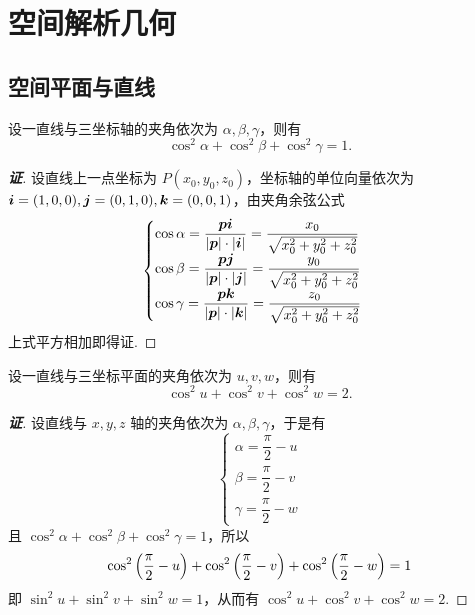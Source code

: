 \section{空间解析几何}

\subsection{空间平面与直线}

\begin{theorem}[线轴夹角余弦平方和公式]
    设一直线与三坐标轴的夹角依次为 $\alpha,\beta,\gamma$，则有 $$\cos^2\alpha+\cos^2\beta+\cos^2\gamma=1.$$
\end{theorem}
\begin{proof}[{\songti \textbf{证}}]
    设直线上一点坐标为 $P(x_0,y_0,z_0)$，坐标轴的单位向量依次为 $\vb*{i}=(1,0,0),\vb*{j}=(0,1,0),\vb*{k}=(0,0,1)$，由夹角余弦公式
    $$\begin{cases}
        \cos\alpha=\dfrac{\vb*{pi}}{|\vb*{p}|\cdot|\vb*{i}|}=\dfrac{x_0}{\sqrt{x_0^2+y_0^2+z_0^2}}\\
        \cos\beta=\dfrac{\vb*{pj}}{|\vb*{p}|\cdot|\vb*{j}|}=\dfrac{y_0}{\sqrt{x_0^2+y_0^2+z_0^2}}\\
        \cos\gamma=\dfrac{\vb*{pk}}{|\vb*{p}|\cdot|\vb*{k}|}=\dfrac{z_0}{\sqrt{x_0^2+y_0^2+z_0^2}}\\
    \end{cases}
    $$
    上式平方相加即得证.
\end{proof}

\begin{theorem}[线面夹角余弦平方和公式]
    设一直线与三坐标平面的夹角依次为 $u,v,w$，则有 $$\cos^2u+\cos^2v+\cos^2w=2.$$
\end{theorem}
\begin{proof}[{\songti \textbf{证}}]
    设直线与 $x,y,z$ 轴的夹角依次为 $\alpha,\beta,\gamma$，于是有 
    $$\begin{cases}
        \alpha=\dfrac{\pi}{2}-u\\[6pt]\beta=\dfrac{\pi}{2}-v\\[6pt]\gamma=\dfrac{\pi}{2}-w
    \end{cases}$$
    且 $\cos^2\alpha+\cos^2\beta+\cos^2\gamma=1$，所以 
    $$\cos^2\qty(\dfrac{\pi}{2}-u)+\cos^2\qty(\dfrac{\pi}{2}-v)+\cos^2\qty(\dfrac{\pi}{2}-w)=1$$
    即 $\sin^2u+\sin^2v+\sin^2w=1$，从而有 $\cos^2u+\cos^2v+\cos^2w=2.$
\end{proof}

